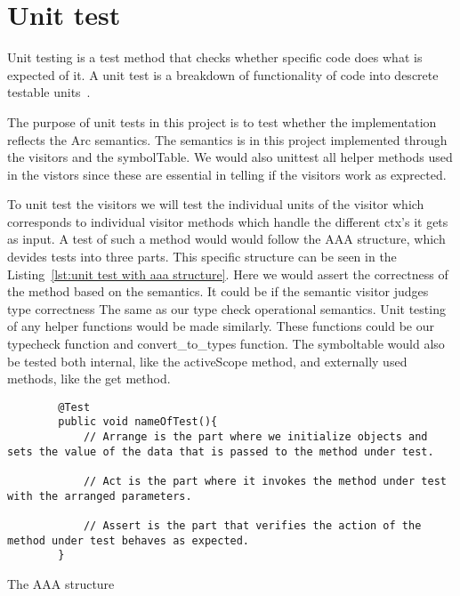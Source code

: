 \section{Unit test}\label{subsec:unittest}
Unit testing is a test method that checks whether specific code does what is expected of it. A unit test is a breakdown of functionality of code into descrete testable units~\cite{UnitTestBasic}.

The purpose of unit tests in this project is to test whether the implementation reflects the Arc semantics. The semantics is in this project implemented through the visitors and the symbolTable. We would also unittest all helper methods used in the vistors since these are essential in telling if the visitors work as exprected.

To unit test the visitors we will test the individual units of the visitor which corresponds to individual visitor methods which handle the different ctx's it gets as input. A test of such a method would  would follow the AAA structure, which devides tests into three parts. This specific structure can be seen in the Listing~\ref{lst:unit test with aaa structure}. Here we would assert the correctness of the method based on the semantics. It could be if the semantic visitor judges type correctness The same as our type check operational semantics. Unit testing of any helper functions would be made similarly. These functions could be our typecheck function and convert_to_types function. The symboltable would also be tested both internal, like the activeScope method, and externally used methods, like the get method. 

\begin{listing}[htb!]
    \begin{verbatim}
        @Test
        public void nameOfTest(){
            // Arrange is the part where we initialize objects and sets the value of the data that is passed to the method under test.

            // Act is the part where it invokes the method under test with the arranged parameters.

            // Assert is the part that verifies the action of the method under test behaves as expected. 
        }
    \end{verbatim}
    \caption{The AAA structure}
    \label{lst:unit test with aaa structure}
\end{listing}



